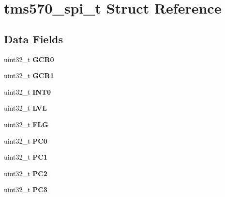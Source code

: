 \hypertarget{structtms570__spi__t}{}\section{tms570\+\_\+spi\+\_\+t Struct Reference}
\label{structtms570__spi__t}
\subsection*{Data Fields}
\begin{DoxyCompactItemize}
\item 
\mbox{\label{structtms570__spi__t_a56517b5bc1c61410899ff2c14bdf235e}} 
uint32\+\_\+t {\bfseries G\+C\+R0}
\item 
\mbox{\label{structtms570__spi__t_a13607015685c84b44a4fd29833db31d6}} 
uint32\+\_\+t {\bfseries G\+C\+R1}
\item 
\mbox{\label{structtms570__spi__t_afb253bfb7ee52ce263395c0c5f33c94c}} 
uint32\+\_\+t {\bfseries I\+N\+T0}
\item 
\mbox{\label{structtms570__spi__t_a5a6e8732d3b796bfe8fc7a33543ef4d2}} 
uint32\+\_\+t {\bfseries L\+VL}
\item 
\mbox{\label{structtms570__spi__t_a23bd2ced15729abecba5cc56afa32b80}} 
uint32\+\_\+t {\bfseries F\+LG}
\item 
\mbox{\label{structtms570__spi__t_a8601914d1f1d7045d56855e254ce67e2}} 
uint32\+\_\+t {\bfseries P\+C0}
\item 
\mbox{\label{structtms570__spi__t_ac72e763f57cedf81619437f13c63b32b}} 
uint32\+\_\+t {\bfseries P\+C1}
\item 
\mbox{\label{structtms570__spi__t_a04fd9889020d347384118a4d9cfe1471}} 
uint32\+\_\+t {\bfseries P\+C2}
\item 
\mbox{\label{structtms570__spi__t_a058409d00b168e68640e9a2ffd9ac29b}} 
uint32\+\_\+t {\bfseries P\+C3}
\item 
\mbox{\label{structtms570__spi__t_ab60b6a8e659c7703f0e7ea7db87e01e0}} 

\end{DoxyCompactItemize}
